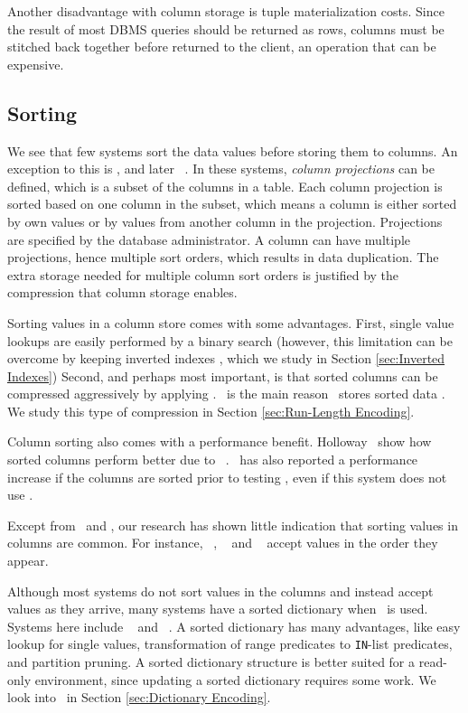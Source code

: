 Another disadvantage with column storage is tuple materialization costs. Since the result of most DBMS queries should be returned as rows, columns must be stitched back together before returned to the client, an operation that can be expensive.


\subsection{Sorting}
\label{sub:Sorting}
We see that few systems sort the data values before storing them to columns. An exception to this is \cstore, and later \vertica~\cite{Lamb2012-kg, Stonebraker2005-qz}. In these systems, \textit{column projections} can be defined, which is a subset of the columns in a table. Each column projection is sorted based on one column in the subset, which means a column is either sorted by own values or by values from another column in the projection. Projections are specified by the database administrator. A column can have multiple projections, hence multiple sort orders, which results in data duplication. The extra storage needed for multiple column sort orders is justified by the compression that column storage enables.


Sorting values in a column store comes with some advantages. First, single value lookups are easily performed by a binary search (however, this limitation can be overcome by keeping inverted indexes \cite{Lemke2010-is, Schwalb2014-hn}, which we study in Section \ref{sec:Inverted Indexes}) Second, and perhaps most important, is that sorted columns can be compressed aggressively by applying \rle. \rle~is the main reason \cstore~stores sorted data \cite{Stonebraker2005-qz}. We study this type of compression in Section \ref{sec:Run-Length Encoding}.

Column sorting also comes with a performance benefit. Holloway \ea~show how sorted columns perform better due to \rle~\cite{Holloway2008-rr}. \blink~has also reported a performance increase if the columns are sorted prior to testing \cite{Johnson2008-cp}, even if this system does not use \rle.

Except from \cstore~and \vertica, our research has shown little indication that sorting values in columns are common. For instance, \mssql~\cite{Larson2013-mc}, \blink~\cite{Raman2013-em} and \oracle~\cite{Lahiri2015-mz} accept values in the order they appear.

Although most systems do not sort values in the columns and instead accept values as they arrive, many systems have a sorted dictionary when \de~is used. Systems here include \blink~\cite{Johnson2008-cp} and \saph~\cite{Farber2012-vh}. A sorted dictionary has many advantages, like easy lookup for single values, transformation of range predicates to \texttt{IN}-list predicates, and partition pruning. A sorted dictionary structure is better suited for a read-only environment, since updating a sorted dictionary requires some work. We look into \de~in Section \ref{sec:Dictionary Encoding}.

